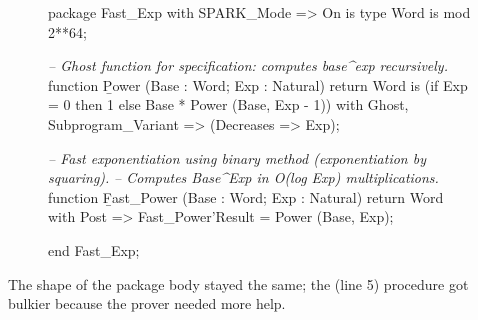 \documentclass{article}
\begin{document}
\begin{figure}
\begin{code}[linenumbers]
package Fast\_Exp
  with SPARK\_Mode => On
is
   type Word is mod 2**64;

   \emph{--  Ghost function for specification: computes base^exp recursively.}
   function \b{Power} (Base : Word; Exp : Natural) return Word is
     (if Exp = 0 then 1 else Base * Power (Base, Exp - 1))
     with Ghost,
          Subprogram\_Variant => (Decreases => Exp);

   \emph{--  Fast exponentiation using binary method (exponentiation by squaring).}
   \emph{--  Computes Base^Exp in O(log Exp) multiplications.}
   function \b{Fast\_Power} (Base : Word; Exp : Natural) return Word
     with Post => Fast\_Power'Result = Power (Base, Exp);

end Fast\_Exp;
\end{code}
\end{figure}

The shape of the package body stayed the same;
the  (line 5) procedure got bulkier because the prover needed more help.
\end{document}
